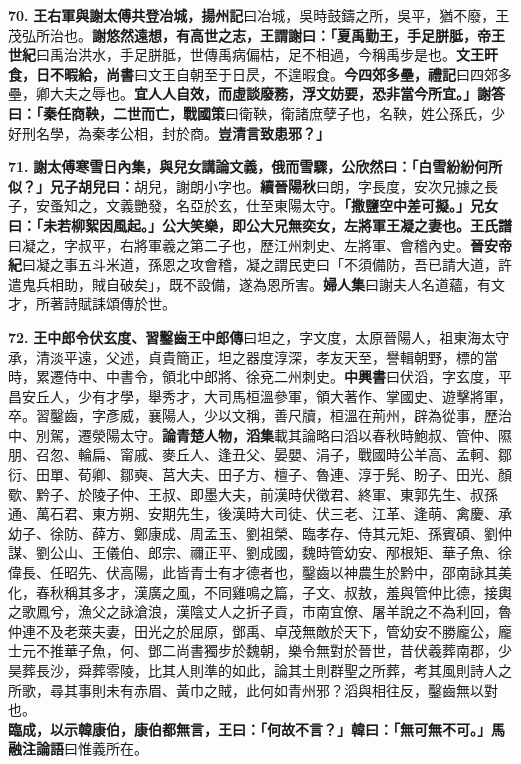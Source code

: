 \textbf{70.} \textbf{王右軍與謝太傅共登冶城，}{\footnotesize \textbf{揚州記}曰冶城，吳時鼓鑄之所，吳平，猶不廢，王茂弘所治也。}\textbf{謝悠然遠想，有高世之志，王謂謝曰：「夏禹勤王，手足胼胝，}{\footnotesize \textbf{帝王世紀}曰禹治洪水，手足胼胝，世傳禹病偏枯，足不相過，今稱禹步是也。}\textbf{文王旰食，日不暇給，}{\footnotesize \textbf{尚書}曰文王自朝至于日昃，不遑暇食。}\textbf{今四郊多壘，}{\footnotesize \textbf{禮記}曰四郊多壘，卿大夫之辱也。}\textbf{宜人人自效，而虛談廢務，浮文妨要，恐非當今所宜。」謝答曰：「秦任商鞅，二世而亡，}{\footnotesize \textbf{戰國策}曰衛鞅，衛諸庶孽子也，名鞅，姓公孫氏，少好刑名學，為秦孝公相，封於商。}\textbf{豈清言致患邪？」}

\textbf{71.} \textbf{謝太傅寒雪日內集，與兒女講論文義，俄而雪驟，公欣然曰：「白雪紛紛何所似？」兄子胡兒曰：}{\footnotesize 胡兒，謝朗小字也。\textbf{續晉陽秋}曰朗，字長度，安次兄據之長子，安蚤知之，文義艷發，名亞於玄，仕至東陽太守。}\textbf{「撒鹽空中差可擬。」兄女曰：「未若柳絮因風起。」公大笑樂，即公大兄無奕女，左將軍王凝之妻也。}{\footnotesize \textbf{王氏譜}曰凝之，字叔平，右將軍羲之第二子也，歷江州刺史、左將軍、會稽內史。\textbf{晉安帝紀}曰凝之事五斗米道，孫恩之攻會稽，凝之謂民吏曰「不須備防，吾已請大道，許遣鬼兵相助，賊自破矣」，既不設備，遂為恩所害。\textbf{婦人集}曰謝夫人名道蘊，有文才，所著詩賦誄頌傳於世。}

\textbf{72.} \textbf{王中郎令伏玄度、習鑿齒}{\footnotesize \textbf{王中郎傳}曰坦之，字文度，太原晉陽人，祖東海太守承，清淡平遠，父述，貞貴簡正，坦之器度淳深，孝友天至，譽輯朝野，標的當時，累遷侍中、中書令，領北中郎將、徐兗二州刺史。\textbf{中興書}曰伏滔，字玄度，平昌安丘人，少有才學，舉秀才，大司馬桓溫參軍，領大著作、掌國史、遊擊將軍，卒。習鑿齒，字彥威，襄陽人，少以文稱，善尺牘，桓溫在荊州，辟為從事，歷治中、別駕，遷滎陽太守。}\textbf{論青楚人物，}{\footnotesize \textbf{滔集}載其論略曰滔以春秋時鮑叔、管仲、隰朋、召忽、輪扁、甯戚、麥丘人、逢丑父、晏嬰、涓子，戰國時公羊高、孟軻、鄒衍、田單、荀卿、鄒奭、莒大夫、田子方、檀子、魯連、淳于髡、盼子、田光、顏歜、黔子、於陵子仲、王叔、即墨大夫，前漢時伏徵君、終軍、東郭先生、叔孫通、萬石君、東方朔、安期先生，後漢時大司徒、伏三老、江革、逢萌、禽慶、承幼子、徐防、薛方、鄭康成、周孟玉、劉祖榮、臨孝存、侍其元矩、孫賓碩、劉仲謀、劉公山、王儀伯、郎宗、禰正平、劉成國，魏時管幼安、邴根矩、華子魚、徐偉長、任昭先、伏高陽，此皆青士有才德者也，鑿齒以神農生於黔中，邵南詠其美化，春秋稱其多才，漢廣之風，不同雞鳴之篇，子文、叔敖，羞與管仲比德，接輿之歌鳳兮，漁父之詠滄浪，漢陰丈人之折子貢，市南宜僚、屠羊說之不為利回，魯仲連不及老萊夫妻，田光之於屈原，鄧禹、卓茂無敵於天下，管幼安不勝龐公，龐士元不推華子魚，何、鄧二尚書獨步於魏朝，樂令無對於晉世，昔伏羲葬南郡，少昊葬長沙，舜葬零陵，比其人則準的如此，論其土則群聖之所葬，考其風則詩人之所歌，尋其事則未有赤眉、黃巾之賊，此何如青州邪？滔與相往反，鑿齒無以對也。}\textbf{臨成，以示韓康伯，康伯都無言，王曰：「何故不言？」韓曰：「無可無不可。」}{\footnotesize \textbf{馬融注論語}曰惟義所在。}

